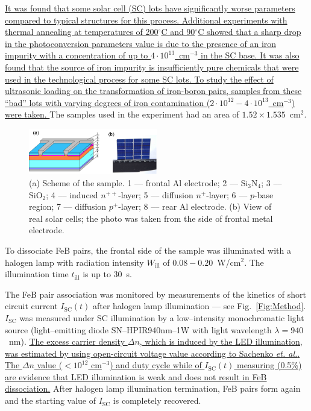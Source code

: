 \documentclass[%
 aip,jap,
 amsmath,amssymb,
 reprint,%
]{revtex4-1}
\begin{document}
\textcolor[rgb]{0.00,0.07,1.00}{\uline{
It was found that some solar cell (SC) lots have significantly worse parameters compared to typical structures for this process.
Additional experiments with thermal annealing at temperatures of 200$^\circ$C and 90$^\circ$C showed that a sharp drop in the photoconversion parameters value is due to the presence of an iron impurity with a concentration of up to $4\cdot10^{13}$~cm$^{-3}$ in the SC base.
It was also found that the source of iron impurity is insufficiently pure chemicals that were used in the technological process for some SC lots.
To study the effect of ultrasonic loading on the transformation  of iron-boron pairs, samples from these ``bad'' lots with varying degrees of iron contamination ($2\cdot10^{12}-4\cdot10^{13}$~cm$^{-3}$) were taken.
}}
The samples used in the experiment had an area of $1.52\times1.535$~cm$^2$.

\begin{figure}
\includegraphics[width=0.5\textwidth]{Fig1}%
\caption{\label{Fig:sample}
(a) Scheme of the sample.
1 –-- frontal Al electrode;
2 –-- Si$_3$N$_4$;
3 –-- SiO$_2$;
4 –-- induced $n^{++}$-layer;
5 –-- diffusion $n^+$-layer;
6 –-- $p$-base region;
7 –-- diffusion $p^+$-layer;
8 –-- rear Al electrode.
(b) View of real solar cells;
the photo was taken from the side of frontal metal electrode.
}
\end{figure}

To dissociate FeB pairs, the frontal side of the sample was illuminated with a halogen lamp with radiation intensity $W_\mathrm{ill}$ of $0.08-0.20$~W/cm$^2$.
The illumination time $t_\mathrm{ill}$ is up to 30~s.

The FeB pair association was monitored by measurements of the kinetics of
short circuit current $I_\mathrm{SC}(t)$ after halogen lamp illumination –-- see Fig.~\ref{Fig:Method}.
$I_\mathrm{SC}$ was measured under SC illumination by a low--intensity monochromatic light source (light--emitting diode SN--HPIR940nm--1W with light wavelength $\lambda=940$~nm).
\textcolor[rgb]{0.00,0.07,1.00}{\uline{
The excess carrier density $\Delta n$, which is induced by the LED illumination,
was estimated by using open-circuit voltage value according to Sachenko \emph{et. al.}\cite{JAPSach}.
The $\Delta n$ value ($<10^{12}$ cm$^{-3}$) and duty cycle while of $I_\mathrm{SC}(t)$ measuring (0.5\%)
are evidence that LED illumination is weak and does not result in FeB dissociation.}}
After halogen lamp illumination termination,
FeB pairs form again and the starting value of $I_\mathrm{SC}$ is completely recovered.
\end{document}
